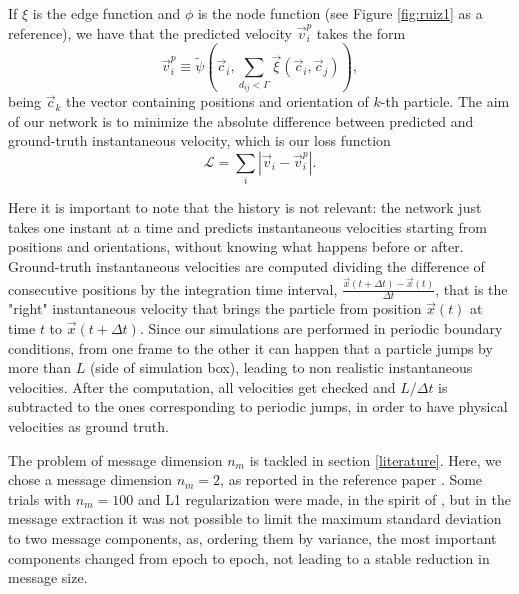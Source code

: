 \documentclass[../../master_thesis_np.tex]{subfiles}
\begin{document}
If $\xi$ is the edge function and $\phi$ is the node function (see Figure \ref{fig:ruiz1} as a reference), we have that the predicted velocity $\vec{v}_i^p$ takes the form
\begin{equation}
	\vec{v}_i^p \equiv \tilde{\psi} \left( \vec{c}_i, \sum_{d_{ij} < \Gamma} \vec{\xi} (\vec{c}_i, \vec{c}_j) \right),
\end{equation}
being $\vec{c}_k$ the vector containing positions and orientation of $k$-th particle.
The aim of our network is to minimize the absolute difference between predicted and ground-truth instantaneous velocity, which is our loss function
\begin{equation}
	\mathcal{L} = \sum_{i} \left| \vec{v}_i - \vec{v}_i^p \right|.
\end{equation}

Here it is important to note that the history is not relevant: the network just takes one instant at a time and predicts instantaneous velocities starting from positions and orientations, without knowing what happens before or after.
Ground-truth instantaneous velocities are computed dividing the difference of consecutive positions by the integration time interval, $\frac{\vec{x}(t + \Delta t) - \vec{x}(t)}{\Delta t}$, that is the "right" instantaneous velocity that brings the particle from position $\vec{x}(t)$ at time $t$ to $\vec{x}(t + \Delta t)$.
Since our simulations are performed in periodic boundary conditions, from one frame to the other it can happen that a particle jumps by more than $L$ (side of simulation box), leading to non realistic instantaneous velocities.
After the computation, all velocities get checked and $L/\Delta t$ is subtracted to the ones corresponding to periodic jumps, in order to have physical velocities as ground truth.

The problem of message dimension $n_m$ is tackled in section \ref{literature}. 
Here, we chose a message dimension $n_m = 2$, as reported in the reference paper \cite{ruiz-garcia_discovering_2024}.
Some trials with $n_m = 100$ and L1 regularization were made, in the spirit of \cite{cranmer_discovering_2020}, but in the message extraction it was not possible to limit the maximum standard deviation to two message components, as, ordering them by variance, the most important components changed from epoch to epoch, not leading to a stable reduction in message size. 
\end{document}

